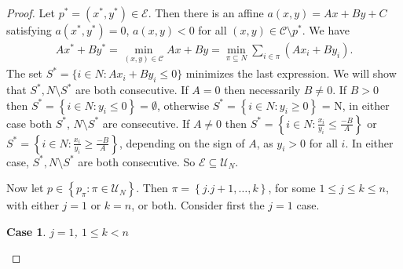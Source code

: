 \documentclass{article}
\theoremstyle{case}
\newtheorem{case}{Case}
\begin{document}
\begin{proof}
Let $p ^* = (x^*, y^*) \in \mathcal{E}$. Then there is an affine $a\left(x,y\right) = Ax + By + C$ satisfying $a(x^*, y^*) = 0$, $a(x,y) < 0$ for all $(x,y) \in \mathcal{C} \setminus p^*$.  We have
\begin{align}
Ax^* + By^* = \min_{(x,y) \in \mathcal{C}} Ax + By = \min_{\pi \subseteq N} \sum_{i \in \pi} (Ax_i + By_i).
\end{align}
The set $S^* = \{ i \in N: Ax_i + By_i \leq 0 \}$ minimizes the last expression. We will show that $S^*, N\setminus S^*$ are both consecutive. If $A = 0$ then necessarily $B \neq 0$. If $B > 0$ then $S^* =\left\lbrace i \in N \colon y_i \leq 0 \right\rbrace = \emptyset$, otherwise $S^* = \left\lbrace i \in N \colon y_i \geq 0 \right\rbrace$ = N, in either case both $S^*$, $N\setminus S^*$ are consecutive. If $ A \neq 0$ then $S^* = \left\lbrace i \in N \colon \frac{x_i}{y_i} \leq \frac{-B}{A} \right\rbrace$ or $S^* = \left\lbrace i \in N \colon \frac{x_i}{y_i} \geq \frac{-B}{A} \right\rbrace$, depending on the sign of $A$, as $y_i > 0$ for all $i$. In either case, $S^*, N\setminus S^*$ are both consecutive. So $\mathcal{E} \subseteq \mathcal{U}_N$.

Now let $p \in \left\lbrace p_{\pi} \colon \pi \in \mathcal{U}_N\right\rbrace$. Then $\pi = \left\lbrace j.j+1, \dots, k \right\rbrace$, for some $1 \leq j \leq k \leq n$, with either $j = 1$ or $k = n$, or both. Consider first the $j = 1$ case.

\begin{case} $j = 1$, $1 \leq k < n$


\end{case}
\end{proof}
\end{document}
